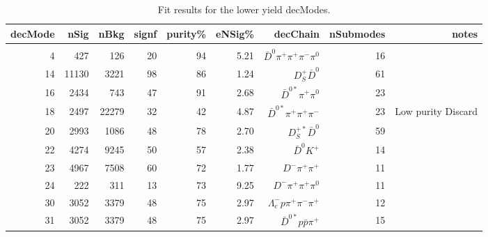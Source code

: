 \begin{table}[h!]
\begin{center}
\begin{tabular}{rrrrrrrrr}
\hline
decMode &  nSig &  nBkg &  signf    &  purity\% &  eNSig\%  & decChain                      &nSubmodes  & notes\\
\hline
\multicolumn{9}{c}{}\\
4       &  427  &  126  &  20       &  94       &  5.21     & $\bar{D}^0\pi^+\pi^+\pi^-\pi^0$    &16         & \\
14      & 11130 &  3221 &  98       &  86       &  1.24     & $D^+_S\bar{D}^0$              &61         & \\
16      & 2434  & 743   &  47       &  91       &  2.68     & $\bar{D}^{0*}\pi^+\pi^0$      &23         & \\
18      & 2497  & 22279 &  32       &  42       &  4.87     & $\bar{D}^{0*}\pi^+\pi^+\pi^-$ &23         & Low purity Discard\\
20      & 2993  & 1086  &  48       &  78       &  2.70     & $D^{+*}_S\bar{D}^0$           &59         & \\
22      & 4274  & 9245  &  50       &  57       &  2.38     & $\bar{D}^0 K^+$               &14         & \\
23      & 4967  & 7508  &  60       &  72       &  1.77     & $D^-\pi^+\pi^+$               &11         & \\
24      & 222   & 311   &  13       &  73       &  9.25     & $D^-\pi^+\pi^+\pi^0$          &11         & \\
30      &  3052 & 3379  &  48       &  75       &  2.97     & $\Lambda^-_cp\pi^+\pi^-\pi^+$ &12         & \\
31      &  3052 & 3379  &  48       &  75       &  2.97     & $\bar{D}^{0*}p\bar{p}\pi^+$   &15         & \\
\hline
\end{tabular}
\caption{Fit results for the lower yield decModes.}
\end{center}
\end{table}

